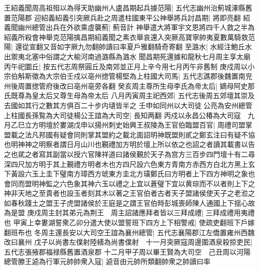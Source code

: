王紹義聞周高祖殂以為得天助幽州人盧昌期起兵據范陽|{
	五代志幽州治薊城涿縣舊置范陽郡}
迎紹義紹義引突厥兵赴之周遣柱國東平公神舉將兵討昌期|{
	將即亮翻}
紹義聞幽州總管出兵在外欲乘虛襲薊|{
	薊音計}
神舉遣大將軍宇文恩將四千人救之半為紹義所殺會神舉克范陽擒昌期紹義聞之素衣舉哀還入突厥高寶寧帥夷夏數萬騎救范陽|{
	還從宣翻又音如字厥九勿翻帥讀曰率夏戶雅翻騎奇寄翻}
至潞水|{
	水經注鮑丘水出禦夷北塞中俗謂之大榆河南過潞縣為潞水}
聞昌期死還據和龍秋七月周主享太廟丙午祀圜丘|{
	按五代志周祭圓丘及南郊並正月上辛今用七月丙午非舊制}
庚戍周以小宗伯斛斯徵為大宗伯壬戍以亳州揔管楊堅為上柱國大司馬|{
	五代志譙郡後魏置南兖州後周置揔管府後改曰亳州亳旁各翻}
癸亥周主尊所生母李氏為帝太后|{
	嫡母阿史那氏既尊為皇太后又尊生母為帝太后}
八月丙寅周主祀西郊|{
	五代志後周五郊壇其崇及去國如其行之數其方俱百二十步内壝皆半之}
壬申如同州以大司徒公亮為安州總管上柱國長孫覧為大司徒楊公王誼為大司空|{
	長知两翻}
丙戍以永昌公椿為大司寇　九月乙巳立方明壇於婁湖戊申以揚州刺史始興王叔陵為王官伯臨盟百官|{
	周禮司盟掌盟載之法凡邦國有疑會同則掌其盟約之載北面詔明神既盟則貳之鄭玄注曰有疑不協也明神神之明察者謂日月山川也覲禮加方明於壇上所以依之也詔之者讀其載書以告之也貮之者寫其副當以授六官陳祥道曰諸侯覲於天子為宫方三百步四門壇十有二尋深四尺加方明于其上覲禮方明者木也方四尺設六色東方青南方赤西方白北方黑上玄下黃設六玉上圭下璧南方璋西方琥東方圭北方璜鄭氏曰方明者上下四方神明之象也會同而盟明神監之六色象其神六玉以禮之上宜以蒼璧下宜以黄琮而不以者則上下之神非天地之至貴者也設玉者刻其木以著之王官伯者古者天子盟諸侯使天子之老涖之如春秋踐土之盟王子虎盟諸侯於王庭是之謂王官伯時彭城喪師陳人通國上下揺心故為是盟}
庚戍周主封其弟元為荆王　周主詔諸應拜者皆以三拜成禮|{
	三拜成禮用夷禮也}
甲寅上幸婁湖誓衆乙卯分遣大使以盟誓班下四方上下相警戒|{
	使疏吏翻班下戶嫁翻班布也}
冬周主還長安以大司空王誼為襄州總管|{
	五代志襄陽郡江左僑置雍州西魏改曰襄州}
戊子以尚書左僕射陸繕為尚書僕射　十一月突厥寇周邊圍酒泉殺掠吏民|{
	五代志張掖郡福禄縣舊置酒泉郡}
十二月甲子周以畢王賢為大司空　己丑周以河陽總管滕王逌為行軍元帥帥衆入寇|{
	逌音由元帥所類翻帥衆之帥讀曰率}


